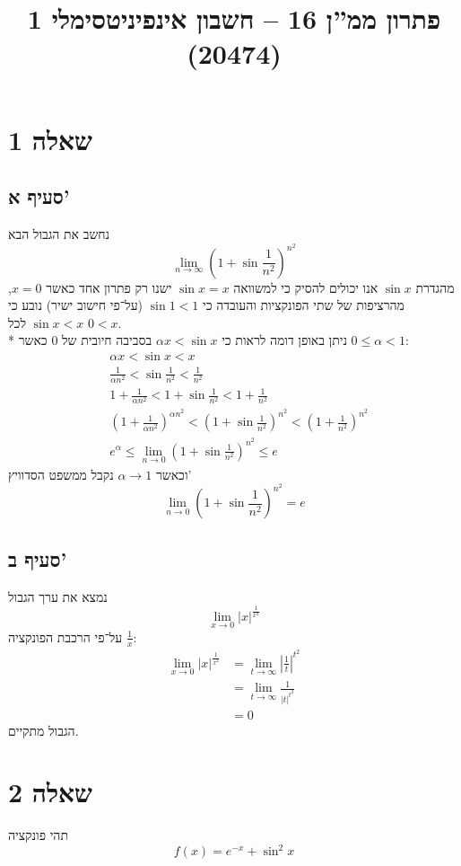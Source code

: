 
\title{פתרון ממ''ן 16 – חשבון אינפיניטסימלי 1 (20474)}


\maketitle
\section{שאלה 1}
\subsection{סעיף א'}
נחשב את הגבול הבא
\[
	\lim_{n \to \infty} {\left( 1 + \sin \frac{1}{n^2} \right)}^{n^2}
\]
מהגדרת $\sin x$ אנו יכולים להסיק כי למשוואה $\sin x = x$ ישנו רק פתרון אחד כאשר $x = 0$,
מהרציפות של שתי הפונקציות והעובדה כי $\sin 1 < 1$ (על־פי חישוב ישיר) נובע כי $\sin x < x$ לכל $0 < x$. \\*
ניתן באופן דומה לראות כי $\alpha x < \sin x$ בסביבה חיובית של $0$ כאשר $0 \le \alpha < 1$:
\begin{align*}
	& \alpha x < \sin x < x \\
	& \frac{1}{\alpha n^2} < \sin \frac{1}{n^2} < \frac{1}{n^2} \\
	& 1 + \frac{1}{\alpha n^2} < 1 + \sin \frac{1}{n^2} < 1 + \frac{1}{n^2} \\
	& {\left( 1 + \frac{1}{\alpha n^2} \right)}^{\alpha n^2} < {\left( 1 + \sin \frac{1}{n^2} \right)}^{n^2} < {\left(1 + \frac{1}{n^2} \right)}^{n^2} \\
	& e^\alpha \le \lim_{n \to 0} {\left( 1 + \sin \frac{1}{n^2} \right)}^{n^2} \le e
\end{align*}
וכאשר $\alpha \to 1$ נקבל ממשפט הסדוויץ'
\[
	\lim_{n \to 0} {\left( 1 + \sin \frac{1}{n^2} \right)}^{n^2} = e
\]

\subsection{סעיף ב'}
נמצא את ערך הגבול
\[
	\lim_{x \to 0} |x|^{\frac{1}{x^2}}
\]
על־פי הרכבת הפונקציה $\frac{1}{x}$:
\begin{align*}
	\lim_{x \to 0} |x|^{\frac{1}{x^2}}
	& = \lim_{t \to \infty} {\left\lvert \frac{1}{t} \right\rvert}^{t^2} \\
	& = \lim_{t \to \infty} \frac{1}{|t|^{t^2} } \\
	& = 0
\end{align*}
הגבול מתקיים.

\section{שאלה 2}
תהי פונקציה
\[
	f(x) = e^{-x} + \sin^2 x
\]

